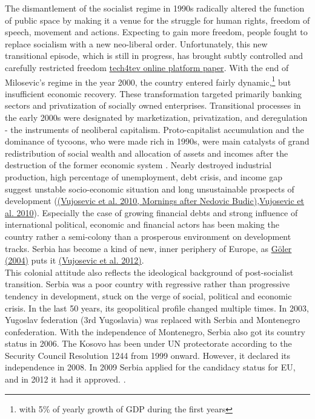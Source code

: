 \documentclass[11pt]{report}
\begin{document}
The dismantlement of the socialist regime in 1990s radically altered the function of public space by making it a venue for the struggle for human rights, freedom of speech, movement and actions.
Expecting to gain more freedom, people fought to replace socialism with a new neo-liberal order.
Unfortunately, this new transitional episode, which is still in progress, has brought subtly controlled and carefully restricted freedom \href{ref}{tech4tev online platform paper}.
With the end of Milosevic's regime in the year 2000, the country entered fairly dynamic,\footnote{with 5\% of yearly growth of GDP during the first years} but insufficient economic recovery.
These transformation targeted primarily banking sectors and privatization of socially owned enterprises. Transitional processes in the early 2000s were designated by marketization, privatization, and deregulation - the instruments of neoliberal capitalism.
Proto-capitalist accumulation and the dominance of tycoons, who were made rich in 1990s, were main catalysts of grand redistribution of social wealth and allocation of assets and incomes after the destruction of the former economic system \href{ref}{\citealt{vujosevic_collapse_2010}}.
Nearly destroyed industrial production, high percentage of unemployment, debt crisis, and income gap suggest unstable socio-economic situation and long unsustainable prospects of development (\href{ref}{(Vujosevic et al. 2010, Mornings after Nedovic Budic)},\href{ref}{Vujosevic et al. 2010}).
Especially the case of growing financial debts and strong influence of international political, economic and financial actors has been making the country rather a semi-colony than a prosperous environment on development tracks. Serbia has become a kind of new, inner periphery of Europe, as \href{ref}{Göler (2004)} puts it \href{ref}{(Vujosevic et al. 2012)}.
\\     
This colonial attitude also reflects the ideological background of post-socialist transition.
Serbia was a poor country with regressive rather than progressive tendency in development, stuck on the verge of social, political and economic crisis.
In the last 50 years, its geopolitical profile changed multiple times.
 In 2003, Yugoslav federation (3rd Yugoslavia) was replaced with Serbia and Montenegro confederation.
With the independence of Montenegro, Serbia also got its country status in 2006.
The Kosovo has been under UN protectorate according to the Security Council Resolution 1244 from 1999 onward. However, it declared its independence in 2008.
In 2009 Serbia applied for the candidacy status for EU, and in 2012 it had it approved. .
\\
\end{document}
